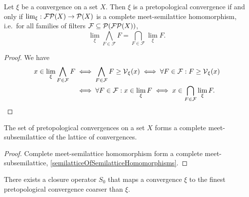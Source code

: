 \begin{proposition}
Let $\xi$ be a convergence on a set $X$. Then $\xi$ is a pretopological convergence \textup{if and only if} $\lim_\xi: \operatorname{\mathcal{FP}}(X)\to \operatorname{\mathcal{P}}(X)$ is a complete meet-semilattice homomorphism, i.e.\
for all families of filters $\mathcal{F} \subseteq \operatorname{\mathcal{P}}(\operatorname{\mathcal{FP}}(X))$,
\[ \lim_\xi \bigwedge_{F\in \mathcal{F}}F = \bigcap_{F\in\mathcal{F}}\lim_\xi F. \] 
\end{proposition}
\begin{proof}
We have
\begin{align*}
x\in \lim_\xi \bigwedge_{F\in \mathcal{F}}F &\iff \bigwedge_{F\in \mathcal{F}}F \geq \operatorname{\mathcal{V}}_\xi(x) \iff \forall F\in\mathcal{F}: F\geq \operatorname{\mathcal{V}}_\xi(x) \\
&\iff \forall F\in \mathcal{F}: x\in\lim_\xi F \iff x\in \bigcap_{F\in\mathcal{F}}\lim_\xi F.
\end{align*}
\end{proof}
\begin{corollary}
The set of pretopological convergences on a set $X$ forms a complete meet-subsemilattice of the lattice of convergences.
\end{corollary}
\begin{proof}
Complete meet-semilattice homomorphism form a complete meet-subsemilattice, \ref{semilatticeOfSemilatticeHomomorphisms}.
\end{proof}
\begin{corollary}
There exists a closure operator $S_0$ that maps a convergence $\xi$ to the finest pretopological convergence coarser than $\xi$.
\end{corollary}

